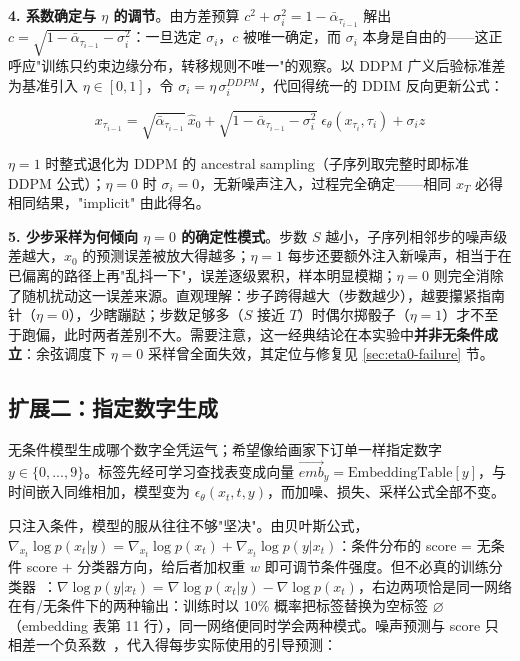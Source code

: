 \documentclass[11pt]{article}
\begin{document}
\textbf{4. 系数确定与 $\eta$ 的调节}。由方差预算 $c^2+\sigma_i^2 = 1-\bar{\alpha}_{\tau_{i-1}}$ 解出 $c = \sqrt{1-\bar{\alpha}_{\tau_{i-1}}-\sigma_i^2}$：一旦选定 $\sigma_i$，$c$ 被唯一确定，而 $\sigma_i$ 本身是自由的——这正呼应"训练只约束边缘分布，转移规则不唯一"的观察。以 DDPM 广义后验标准差为基准引入 $\eta\in[0,1]$，令 $\sigma_i = \eta\,\sigma_i^{DDPM}$，代回得统一的 DDIM 反向更新公式：

\begin{equation}
    \boxed{x_{\tau_{i-1}} = \sqrt{\bar{\alpha}_{\tau_{i-1}}}\,\hat{x}_0 + \sqrt{1-\bar{\alpha}_{\tau_{i-1}}-\sigma_i^2}\;\epsilon_\theta(x_{\tau_i},\tau_i) + \sigma_i z}
\end{equation}

$\eta=1$ 时整式退化为 DDPM 的 ancestral sampling（子序列取完整时即标准 DDPM 公式）；$\eta=0$ 时 $\sigma_i=0$，无新噪声注入，过程完全确定——相同 $x_T$ 必得相同结果，"implicit" 由此得名。

\textbf{5. 少步采样为何倾向 $\eta=0$ 的确定性模式}。步数 $S$ 越小，子序列相邻步的噪声级差越大，$\hat{x}_0$ 的预测误差被放大得越多；$\eta=1$ 每步还要额外注入新噪声，相当于在已偏离的路径上再"乱抖一下"，误差逐级累积，样本明显模糊；$\eta=0$ 则完全消除了随机扰动这一误差来源。直观理解：步子跨得越大（步数越少），越要攥紧指南针（$\eta=0$），少瞎蹦跶；步数足够多（$S$ 接近 $T$）时偶尔掷骰子（$\eta=1$）才不至于跑偏，此时两者差别不大。需要注意，这一经典结论在本实验中\textbf{并非无条件成立}：余弦调度下 $\eta=0$ 采样曾全面失效，其定位与修复见 \ref{sec:eta0-failure} 节。

\subsection{扩展二：指定数字生成}

无条件模型生成哪个数字全凭运气；希望像给画家下订单一样指定数字 $y\in\{0,...,9\}$。标签先经可学习查找表变成向量 $\vec{emb}_y = \mathrm{EmbeddingTable}[y]$，与时间嵌入同维相加，模型变为 $\epsilon_\theta(x_t,t,y)$，而加噪、损失、采样公式全部不变。

只注入条件，模型的服从往往不够"坚决"。由贝叶斯公式，$\nabla_{x_t}\log p(x_t|y) = \nabla_{x_t}\log p(x_t) + \nabla_{x_t}\log p(y|x_t)$：条件分布的 score = 无条件 score + 分类器方向，给后者加权重 $w$ 即可调节条件强度。但不必真的训练分类器~\parencite{ho2022classifierfree}：$\nabla\log p(y|x_t) = \nabla\log p(x_t|y) - \nabla\log p(x_t)$，右边两项恰是同一网络在有/无条件下的两种输出：训练时以 10\% 概率把标签替换为空标签 $\varnothing$（embedding 表第 11 行），同一网络便同时学会两种模式。噪声预测与 score 只相差一个负系数~\parencite{song2021score}，代入得每步实际使用的引导预测：
\end{document}

